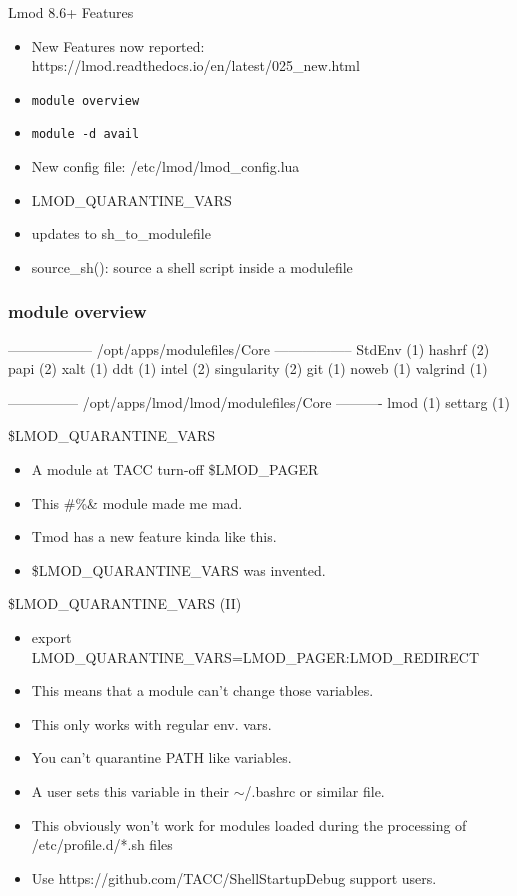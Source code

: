 \documentclass{beamer}
\begin{document}
\begin{frame}{Lmod 8.6+ Features}
  \begin{itemize}
    \item New Features now reported:
      https://lmod.readthedocs.io/en/latest/025\_new.html
    \item \texttt{module overview}
    \item \texttt{module -d avail}
    \item New config file: /etc/lmod/lmod\_config.lua
    \item LMOD\_QUARANTINE\_VARS
    \item updates to sh\_to\_modulefile
    \item source\_sh(): source a shell script inside a modulefile
  \end{itemize}
\end{frame}

\begin{frame}[fragile]
  \frametitle{module overview}
    {\tiny
\begin{semiverbatim}
------------------ /opt/apps/modulefiles/Core -----------------
StdEnv    (1)   hashrf    (2)   papi        (2)   xalt     (1)
ddt       (1)   intel     (2)   singularity (2)
git       (1)   noweb     (1)   valgrind    (1)

--------------- /opt/apps/lmod/lmod/modulefiles/Core ----------
lmod (1)   settarg (1)    
\end{semiverbatim}
    }
\end{frame}

\begin{frame}{\$LMOD\_QUARANTINE\_VARS}
  \begin{itemize}
    \item A module at TACC turn-off  \$LMOD\_PAGER
    \item This \!\@\#\%\& module made me mad.
    \item Tmod has a new feature kinda like this.
    \item \$LMOD\_QUARANTINE\_VARS was invented.
  \end{itemize}
\end{frame}

\begin{frame}{\$LMOD\_QUARANTINE\_VARS (II)}
  \begin{itemize}
    \item export LMOD\_QUARANTINE\_VARS=LMOD\_PAGER:LMOD\_REDIRECT
    \item This means that a module can't change those variables.
    \item This only works with regular env. vars.
    \item You can't quarantine PATH like variables.
    \item A user sets this variable in their $\sim$/.bashrc or similar
      file.
    \item This obviously won't work for modules loaded during the
      processing of /etc/profile.d/*.sh files
    \item Use https://github.com/TACC/ShellStartupDebug support users.
  \end{itemize}
\end{frame}
\end{document}
